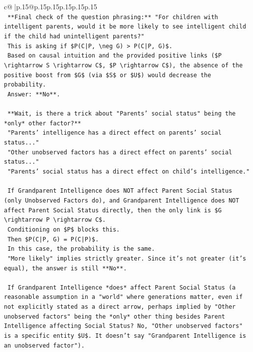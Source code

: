 \documentclass{article}
\begin{document}
{\begin{supertabular}{c@{$\;$}|p{.15\linewidth}@{}p{.15\linewidth}p{.15\linewidth}p{.15\linewidth}p{.15\linewidth}p{.15\linewidth}}
{{{\\ 
\texttt{    **Final check of the question phrasing:** "For children with intelligent parents, would it be more likely to see intelligent child if the child had unintelligent parents?"} \\
\texttt{    This is asking if \$P(C|P, \textbackslash{}neg G) > P(C|P, G)\$.} \\
\texttt{    Based on causal intuition and the provided positive links (\$P \textbackslash{}rightarrow S \textbackslash{}rightarrow C\$, \$P \textbackslash{}rightarrow C\$), the absence of the positive boost from \$G\$ (via \$S\$ or \$U\$) would decrease the probability.} \\
\texttt{    Answer: **No**.} \\
\\ 
\texttt{    **Wait, is there a trick about "Parents' social status" being the *only* other factor?**} \\
\texttt{    "Parents' intelligence has a direct effect on parents' social status..."} \\
\texttt{    "Other unobserved factors has a direct effect on parents' social status..."} \\
\texttt{    "Parents' social status has a direct effect on child's intelligence."} \\
\\ 
\texttt{    If Grandparent Intelligence does NOT affect Parent Social Status (only Unobserved Factors do), and Grandparent Intelligence does NOT affect Parent Social Status directly, then the only link is \$G \textbackslash{}rightarrow P \textbackslash{}rightarrow C\$.} \\
\texttt{    Conditioning on \$P\$ blocks this.} \\
\texttt{    Then \$P(C|P, G) = P(C|P)\$.} \\
\texttt{    In this case, the probability is the same.} \\
\texttt{    "More likely" implies strictly greater. Since it's not greater (it's equal), the answer is still **No**.} \\
\\ 
\texttt{    If Grandparent Intelligence *does* affect Parent Social Status (a reasonable assumption in a "world" where generations matter, even if not explicitly stated as a direct arrow, perhaps implied by "Other unobserved factors" being the *only* other thing besides Parent Intelligence affecting Social Status? No, "Other unobserved factors" is a specific entity \$U\$. It doesn't say "Grandparent Intelligence is an unobserved factor").} \\
}}}
\end{supertabular}}
\end{document}
